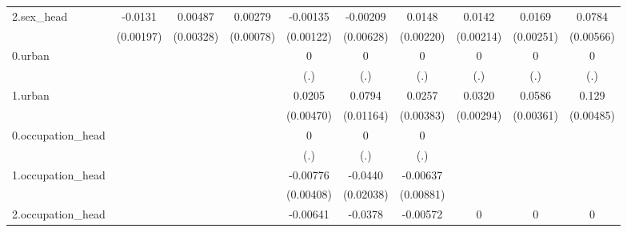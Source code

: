 \begin{table}[htbp]
{\begin{tabular}{l*{9}{c}}
2.sex_head  &     -0.0131\sym{***}&     0.00487         &     0.00279\sym{***}&    -0.00135         &    -0.00209         &      0.0148\sym{***}&      0.0142\sym{***}&      0.0169\sym{***}&      0.0784\sym{***}\\
            &   (0.00197)         &   (0.00328)         &   (0.00078)         &   (0.00122)         &   (0.00628)         &   (0.00220)         &   (0.00214)         &   (0.00251)         &   (0.00566)         \\
0.urban     &                     &                     &                     &           0         &           0         &           0         &           0         &           0         &           0         \\
            &                     &                     &                     &         (.)         &         (.)         &         (.)         &         (.)         &         (.)         &         (.)         \\
1.urban     &                     &                     &                     &      0.0205\sym{***}&      0.0794\sym{***}&      0.0257\sym{***}&      0.0320\sym{***}&      0.0586\sym{***}&       0.129\sym{***}\\
            &                     &                     &                     &   (0.00470)         &   (0.01164)         &   (0.00383)         &   (0.00294)         &   (0.00361)         &   (0.00485)         \\
0.occupation_head&                     &                     &                     &           0         &           0         &           0         &                     &                     &                     \\
            &                     &                     &                     &         (.)         &         (.)         &         (.)         &                     &                     &                     \\
1.occupation_head&                     &                     &                     &    -0.00776\sym{*}  &     -0.0440\sym{**} &    -0.00637         &                     &                     &                     \\
            &                     &                     &                     &   (0.00408)         &   (0.02038)         &   (0.00881)         &                     &                     &                     \\
2.occupation_head&                     &                     &                     &    -0.00641\sym{***}&     -0.0378\sym{***}&    -0.00572\sym{*}  &           0         &           0         &           0         \\

\end{tabular}}
\end{table}
